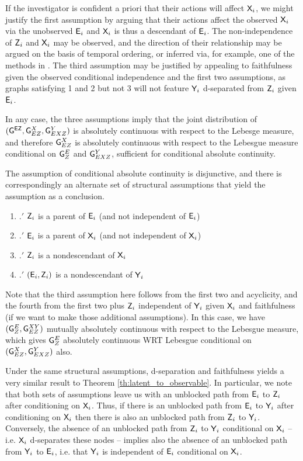 If the investigator is confident a priori that their actions will affect $\mathsf{X}_i$, we might justify the first assumption by arguing that their actions affect the observed $\mathsf{X}_i$ via the unobserved $\mathsf{E}_i$ and $\mathsf{X}_i$ is thus a descendant of $\mathsf{E}_i$. The non-independence of $\mathsf{Z}_i$ and $\mathsf{X}_i$ may be observed, and the direction of their relationship may be argued on the basis of temporal ordering, or inferred via, for example, one of the methods in \citep{peters_elements_2017}. The third assumption may be justified by appealing to faithfulness given the observed conditional independence and the first two assumptions, as graphs satisfying 1 and 2 but not 3 will not feature $\mathsf{Y}_i$ d-separated from $\mathsf{Z}_i$ given $\mathsf{E}_i$.    

In any case, the three assumptions imply that the joint distribution of $(\mathsf{G}^{\mathsf{EZ}}, \mathsf{G}^{X}_{EZ}, \mathsf{G}^Y_{EXZ})$ is absolutely continuous with respect to the Lebesge measure, and therefore $\mathsf{G}^X_{EZ}$ is absolutely continuous with respect to the Lebesgue measure conditional on $\mathsf{G}^E_Z$ and $\mathsf{G}^Y_{EXZ}$, sufficient for conditional absolute continuity.

The assumption of conditional absolute continuity is disjunctive, and there is correspondingly an alternate set of structural assumptions that yield the assumption as a conclusion.

\begin{enumerate}
    \item$.'$ $\mathsf{Z}_i$ is a parent of $\mathsf{E}_i$ (and not independent of $\mathsf{E}_i$)
    \item$.'$ $\mathsf{E}_i$ is a parent of $\mathsf{X}_i$ (and not independent of $\mathsf{X}_i$)
    \item$.'$ $\mathsf{Z}_i$ is a nondescendant of $\mathsf{X}_i$
    \item$.'$ $(\mathsf{E}_i, \mathsf{Z}_i)$ is a nondescendant of $\mathsf{Y}_i$
\end{enumerate}

Note that the third assumption here follows from the first two and acyclicity, and the fourth from the first two plus $\mathsf{Z}_i$ independent of $\mathsf{Y}_i$ given $\mathsf{X}_i$ and faithfulness (if we want to make those additional assumptions). In this case, we have $(\mathsf{G}^E_Z, \mathsf{G}^{XY}_{EZ})$ mutually absolutely continuous with respect to the Lebesgue measure, which gives $\mathsf{G}^E_Z$ absolutely continuous WRT Lebesgue conditional on $(\mathsf{G}^X_{EZ}, \mathsf{G}^Y_{EXZ})$ also.

Under the same structural assumptions, d-separation and faithfulness yields a very similar result to Theorem \ref{th:latent_to_observable}. In particular, we note that both sets of assumptions leave us with an unblocked path from $\mathsf{E}_i$ to $\mathsf{Z}_i$ after conditioning on $\mathsf{X}_i$. Thus, if there is an unblocked path from $\mathsf{E}_i$ to $\mathsf{Y}_i$ after conditioning on $\mathsf{X}_i$ then there is also an unblocked path from $\mathsf{Z}_i$ to $\mathsf{Y}_i$. Conversely, the absence of an unblocked path from $\mathsf{Z}_i$ to $\mathsf{Y}_i$ conditional on $\mathsf{X}_i$ -- i.e. $\mathsf{X}_i$ d-separates these nodes -- implies also the absence of an unblocked path from $\mathsf{Y}_i$ to $\mathsf{E}_i$, i.e. that $\mathsf{Y}_i$ is independent of $\mathsf{E}_i$ conditional on $\mathsf{X}_i$.

